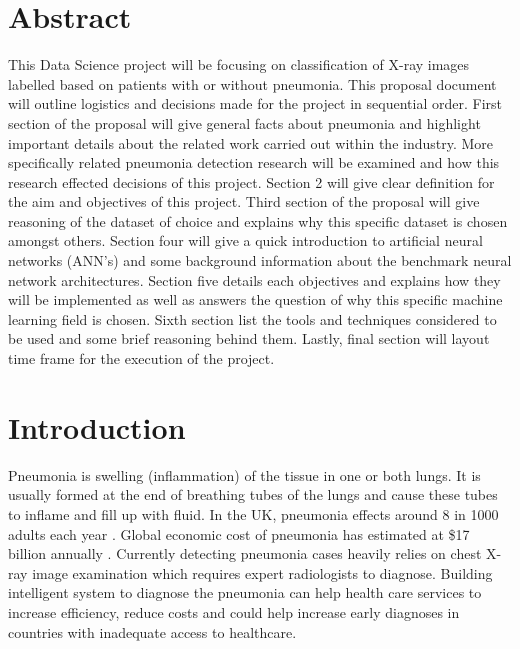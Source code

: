 \documentclass[12pt, twoside, a4paper]{article}
\begin{document}
\section*{Abstract}
This Data Science project will be focusing on classification of X-ray images labelled based on patients with or without pneumonia. This proposal document will outline logistics and decisions made for the project in sequential order. First section of the proposal will give general facts about pneumonia and highlight important details about the related work carried out within the industry. More specifically related pneumonia detection research will be examined and how this research effected decisions of this project. Section 2 will give clear definition for the aim and objectives of this project. Third section of the proposal will give reasoning of the dataset of choice and explains why this specific dataset is chosen amongst others. Section four will give a quick introduction to artificial neural networks (ANN's) and some background information about the benchmark neural network architectures. Section five details each objectives and explains how they will be implemented as well as answers the question of why this specific machine learning field is chosen. Sixth section list the tools and techniques considered to be used and some brief reasoning behind them. Lastly, final section will layout time frame for the execution of the project. 

\clearpage

\tableofcontents
\thispagestyle{empty}
\cleardoublepage
    

\setcounter{page}{1}


\section{Introduction}

Pneumonia is swelling (inflammation) of the tissue in one or both lungs. It is usually formed at the end of breathing tubes of the lungs and cause these tubes to inflame and fill up with fluid. In the UK, pneumonia effects around 8 in 1000 adults each year \cite{nhs}. Global economic cost of pneumonia has estimated at \$17 billion annually \cite{cost}. Currently detecting pneumonia cases heavily relies on chest X-ray image examination which requires expert radiologists to diagnose. Building intelligent system to diagnose the pneumonia can help  health care services to increase efficiency, reduce costs and could help increase early diagnoses in countries with inadequate access to healthcare.
\end{document}
